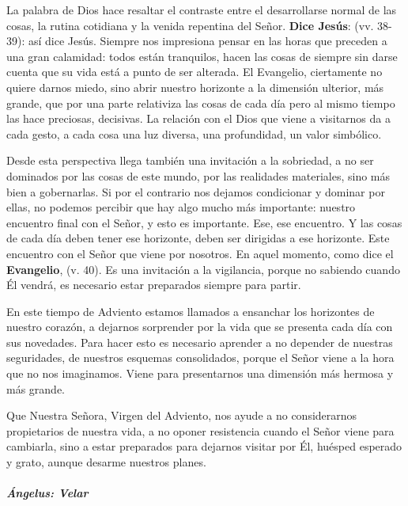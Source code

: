 \documentclass[]{article}
\let\oldsubparagraph\subparagraph
\renewcommand{\subparagraph}[1]{\oldsubparagraph{#1}\mbox{}}
\begin{document}
La palabra de Dios hace resaltar el contraste entre el desarrollarse normal de las cosas, la rutina cotidiana y la venida repentina del Señor. \textbf{Dice Jesús}:  (vv. 38-39): así dice Jesús. Siempre nos impresiona pensar en las horas que preceden a una gran calamidad: todos están tranquilos, hacen las cosas de siempre sin darse cuenta que su vida está a punto de ser alterada. El Evangelio, ciertamente no quiere darnos miedo, sino abrir nuestro horizonte a la dimensión ulterior, más grande, que por una parte relativiza las cosas de cada día pero al mismo tiempo las hace preciosas, decisivas. La relación con el Dios que viene a visitarnos da a cada gesto, a cada cosa una luz diversa, una profundidad, un valor simbólico.

Desde esta perspectiva llega también una invitación a la sobriedad, a no ser dominados por las cosas de este mundo, por las realidades materiales, sino más bien a gobernarlas. Si por el contrario nos dejamos condicionar y dominar por ellas, no podemos percibir que hay algo mucho más importante: nuestro encuentro final con el Señor, y esto es importante. Ese, ese encuentro. Y las cosas de cada día deben tener ese horizonte, deben ser dirigidas a ese horizonte. Este encuentro con el Señor que viene por nosotros. En aquel momento, como dice el \textbf{Evangelio},  (v. 40). Es una invitación a la vigilancia, porque no sabiendo cuando Él vendrá, es necesario estar preparados siempre para partir.

En este tiempo de Adviento estamos llamados a ensanchar los horizontes de nuestro corazón, a dejarnos sorprender por la vida que se presenta cada día con sus novedades. Para hacer esto es necesario aprender a no depender de nuestras seguridades, de nuestros esquemas consolidados, porque el Señor viene a la hora que no nos imaginamos. Viene para presentarnos una dimensión más hermosa y más grande.

Que Nuestra Señora, Virgen del Adviento, nos ayude a no considerarnos propietarios de nuestra vida, a no oponer resistencia cuando el Señor viene para cambiarla, sino a estar preparados para dejarnos visitar por Él, huésped esperado y grato, aunque desarme nuestros planes.

\subparagraph{Ángelus: Velar}\label{uxe1ngelus-velar}
\end{document}
